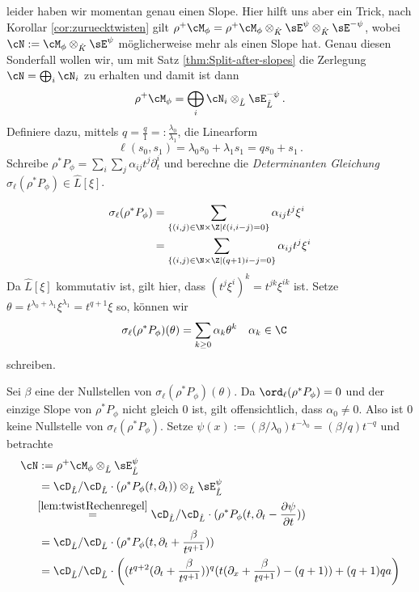 leider haben wir momentan genau einen Slope.
Hier hilft uns aber ein Trick, nach Korollar \ref{cor:zuruecktwisten} gilt
$
\rho^+\cM_{\phi}
  =\rho^+\cM_{\phi}\otimes_{\hat K}\sE^{\psi}\otimes_{\hat K}\sE^{-\psi}
$,
wobei $\cN:=\cM_{\phi}\otimes_{\hat K}\sE^{\psi}$ möglicherweise mehr als
einen Slope hat. Genau diesen Sonderfall wollen wir, um mit Satz
\ref{thm:Split-after-slopes} die Zerlegung $\cN=\bigoplus_i\cN_i$ zu erhalten
und damit ist dann
\[
\rho^+\cM_{\phi}=\bigoplus_i\cN_i\otimes_{\hat L}\sE^{-\psi}_{\hat L} \,.
\]
Definiere dazu, mittels
$q=\frac{q}{1}=:\frac{\lambda_0}{\lambda_1}$, die Linearform
\[
\ell(s_0,s_1)=\lambda_0s_0+\lambda_1s_1=qs_0+s_1 \,.
\]
Schreibe $\rho^*P_{\phi}=\sum_i\sum_j\alpha_{ij}t^j\partial_t^i$ und berechne
die \emph{Determinanten Gleichung} $\sigma_\ell(\rho^*P_{\phi})\in \hat L[\xi]$.
\begin{comment}
Schon gezeigt, das $ord_\ell = 0$?
\end{comment}
\begin{align*}
\sigma_\ell(\rho^*P_{\phi})
  &= \sum_{\{(i,j)\in\N\times\Z \mid \ell(i,i-j)=0\}}\alpha_{ij}t^j\xi^i\\
  &= \sum_{\{(i,j)\in\N\times\Z \mid (q+1)i-j=0\}}\alpha_{ij}t^j\xi^i
\end{align*}
Da $\hat L[\xi]$ kommutativ ist, gilt hier, dass $(t^j\xi^i)^k=t^{jk}\xi^{ik}$
ist.  Setze $\theta=t^{\lambda_0+\lambda_1}\xi^{\lambda_1}=t^{q+1}\xi$ so,
können wir
\begin{align*}
\sigma_\ell(\rho^*P_{\phi})(\theta) 
  &= \sum_{k\geq 0}\alpha_k\theta^k & & \alpha_k\in\C
\end{align*}
schreiben.
\begin{comment}
, welches wir als nächsten Schritt faktorisieren
\[
\sigma_\ell(\rho^*P_\phi)
  =\epsilon\prod_{\beta\mbox{ Nullstelle}}(\theta-\beta)^{\gamma_\beta}\,.
\]
Wobei $\epsilon\in\C^\times$
eine Konstante ist.
\end{comment}
Sei $\beta$  eine der Nullstellen von $\sigma_\ell(\rho^*P_{\phi})(\theta)$.
Da $\ord_\ell(\rho^*P_\phi)=0$ und der einzige Slope von $\rho^*P_\phi$ nicht
gleich $0$ ist, gilt offensichtlich, dass $\alpha_0\neq0$. Also ist $0$ keine
Nullstelle von $\sigma_\ell(\rho^*P_\phi)$.
Setze $\psi(x):=(\beta/\lambda_0)t^{-\lambda_0}=(\beta/q)t^{-q}$ und
betrachte
\begin{align*}
\cN&:=\rho^+\cM_\phi\otimes_{\hat L}\sE_{\hat L}^\psi
\\&= \cD_{\hat L}/\cD_{\hat L}\cdot(\rho^*P_{\phi}(t,\partial_t))
    \otimes_{\hat L}\sE_{\hat L}^\psi
\\&\!\!\overset{\ref{lem:twistRechenregel}}{=}
  \cD_{\hat L}/\cD_{\hat L}\cdot(\rho^*P_{\phi}(t,\partial_t-\frac{\partial
  \psi}{\partial t}))
\\&=\cD_{\hat L}/\cD_{\hat
    L}\cdot(\rho^*P_{\phi}(t,\partial_t+\frac{\beta}{t^{q+1}}))
\\&=\cD_{\hat L}/\cD_{\hat L}\cdot
    \left((t^{q+2}(\partial_t+\frac{\beta}{t^{q+1}}))^{q}
    (t(\partial_x+\frac{\beta}{t^{q+1}})-(q+1))+(q+1)qa \right)
\end{align*}
